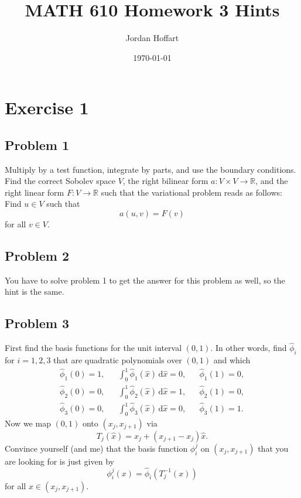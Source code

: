 \documentclass{article}
\title{MATH 610 Homework 3 Hints}
\author{Jordan Hoffart}
\date{\today}
\theoremstyle{definition}
\theoremstyle{plain}
\renewcommand{\d}{\mathrm d}
\begin{document}
\maketitle

\section{Exercise 1}

\subsection{Problem 1}
Multiply by a test function, integrate by parts, and use the boundary conditions.
Find the correct Sobolev space $V$, the right bilinear form $a : V \times V \to \mathbb R$, and the right linear form $F:V\to\mathbb R$ such that the variational problem reads as follows: Find $u \in V$ such that \[a(u,v) = F(v)\] for all $v\in V$.

\subsection{Problem 2}
You have to solve problem 1 to get the answer for this problem as well, so the hint is the same.

\subsection{Problem 3}
First find the basis functions for the unit interval $(0,1)$. 
In other words, find $\widehat \phi_i$ for $i = 1,2,3$ that are quadratic polynomials over $(0,1)$ and which 
\begin{align}
  \widehat\phi_1(0) = 1, && \int_0^1\widehat \phi_1(\widehat x)\,\d\widehat x = 0, && \widehat\phi_1(1) = 0, \\
  \widehat\phi_2(0) = 0, && \int_0^1\widehat \phi_2(\widehat x)\,\d\widehat x = 1, && \widehat\phi_2(1) = 0, \\
  \widehat\phi_3(0) = 0, && \int_0^1\widehat \phi_3(\widehat x)\,\d\widehat x = 0, && \widehat\phi_3(1) = 1.
\end{align}
Now we map $(0,1)$ onto $(x_j,x_{j+1})$ via 
\begin{equation}\label{eq:change_coordinates}
T_j(\widehat x) = x_j + (x_{j+1} - x_j)\widehat x.
\end{equation}
Convince yourself (and me) that the basis function $\phi_i^j$ on $(x_j,x_{j+1})$ that you are looking for is just given by \[\phi_i^j(x) = \widehat \phi_i(T_j^{-1}(x))\] for all $x \in (x_j,x_{j+1})$.
\end{document}
